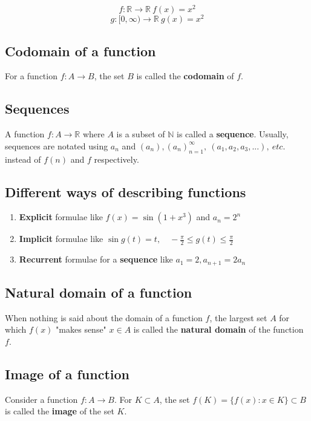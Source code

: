 \documentclass[11pt]{article}
\begin{document}
\[f : \mathbb{R} \rightarrow \mathbb{R} \ f(x) = x^2\]
\[g : [0, \infty) \rightarrow \mathbb{R} \ g(x) = x^2\]

\subsection{Codomain of a function}
\label{sec:org24a29c6}
For a function \(f : A \rightarrow B\), the set \(B\) is called the \textbf{codomain} of \(f\).

\subsection{Sequences}
\label{sec:orgffbb958}
A function \(f : A \rightarrow \mathbb{R}\) where \(A\) is a subset of \(\mathbb{N}\) is called a \textbf{sequence}. Usually, sequences are notated using \(a_n\) and \((a_n), (a_n)_{n=1}^{\infty}, \ (a_1, a_2, a_3, ...), \ etc.\) instead of \(f(n)\) and \(f\) respectively.

\subsection{Different ways of describing functions}
\label{sec:org06f5813}
\begin{enumerate}
\item \textbf{Explicit} formulae like \(f(x) = \sin (1 + x^3)\) and \(a_n = 2^n\)
\item \textbf{Implicit} formulae like \(\sin g(t) = t, \quad -\frac{\pi}{2} \le g(t) \le \frac{\pi}{2}\)
\item \textbf{Recurrent} formulae for a \textbf{sequence} like \(a_1 = 2, a_{n + 1} = 2a_n\)
\end{enumerate}

\subsection{Natural domain of a function}
\label{sec:orgf92569f}
When nothing is said about the domain of a function \(f\), the largest set \(A\) for which \(f(x)\) "makes sense" \(x \in A\) is called the \textbf{natural domain} of the function \(f\).

\subsection{Image of a function}
\label{sec:orgacddb99}
Consider a function \(f : A \rightarrow B\). For \(K \subset A\), the set \(f(K) = \{f(x) : x \in K\} \subset B\) is called the \textbf{image} of the set \(K\).
\end{document}
